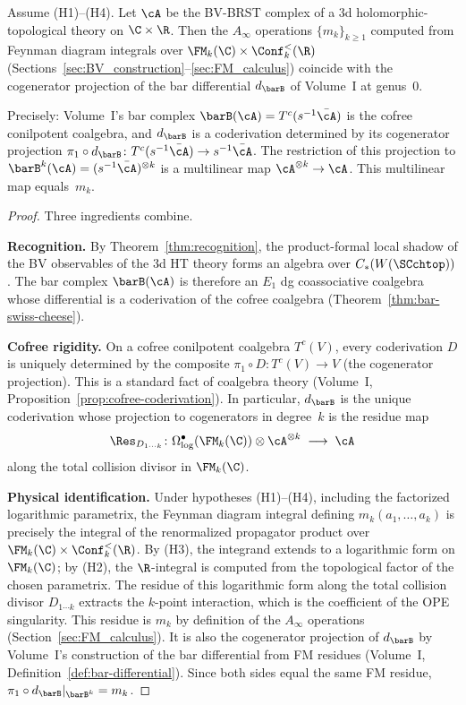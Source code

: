 \begin{theorem}[Feynman $m_k$ = bar differential at genus~$0$;
\ClaimStatusProvedHere]
Assume \textrm{(H1)--(H4)}. Let $\cA$ be the BV-BRST complex of
a 3d holomorphic-topological theory on $\C \times \R$. Then the
$A_\infty$ operations $\{m_k\}_{k \geq 1}$ computed from Feynman
diagram integrals over $\FM_k(\C) \times \Conf_k^{<}(\R)$
(Sections~\ref{sec:BV_construction}--\ref{sec:FM_calculus})
coincide with the cogenerator projection of the bar differential
$d_{\barB}$ of Volume~I at genus~$0$.

Precisely: Volume~I's bar complex
$\barB(\cA) = T^c(s^{-1}\bar{\cA})$ is the cofree conilpotent
coalgebra, and $d_{\barB}$ is a coderivation determined by its
cogenerator projection
$\pi_1 \circ d_{\barB} \colon T^c(s^{-1}\bar{\cA}) \to
s^{-1}\bar{\cA}$. The restriction of this projection to
$\barB^k(\cA) = (s^{-1}\bar{\cA})^{\otimes k}$ is a multilinear
map $\cA^{\otimes k} \to \cA$. This multilinear map
equals~$m_k$.
\end{theorem}

\begin{proof}
Three ingredients combine.

\textbf{Recognition.}
By Theorem~\ref{thm:recognition}, the product-formal local shadow of
the BV observables of the 3d HT theory forms an algebra over
$C_\ast(W(\SCchtop))$. The bar complex
$\barB(\cA)$ is therefore an $E_1$ dg coassociative coalgebra
whose differential is a coderivation
of the cofree coalgebra
(Theorem~\ref{thm:bar-swiss-cheese}).

\textbf{Cofree rigidity.}
On a cofree conilpotent coalgebra $T^c(V)$, every coderivation
$D$ is uniquely determined by the composite
$\pi_1 \circ D \colon T^c(V) \to V$ (the cogenerator projection).
This is a standard fact of coalgebra theory
\textup{(}Volume~I, Proposition~\ref*{prop:cofree-coderivation}\textup{)}.
In particular, $d_{\barB}$ is the unique coderivation whose
projection to cogenerators in degree~$k$ is the residue map
\[
\Res_{D_{1\cdots k}} \colon
\Omega^\bullet_{\log}(\FM_k(\C)) \otimes \cA^{\otimes k}
\;\longrightarrow\; \cA
\]
along the total collision divisor in $\FM_k(\C)$.

\textbf{Physical identification.}
Under hypotheses (H1)--(H4), including the factorized logarithmic
parametrix, the Feynman diagram integral defining
$m_k(a_1, \ldots, a_k)$ is precisely the integral of the
renormalized propagator product over $\FM_k(\C) \times
\Conf_k^{<}(\R)$. By (H3), the integrand extends to a
logarithmic form on $\FM_k(\C)$; by (H2), the $\R$-integral is
computed from the topological factor of the chosen parametrix. The
residue of this logarithmic form along the total collision
divisor $D_{1\cdots k}$ extracts the $k$-point interaction, which
is the coefficient of the OPE singularity. This residue is
$m_k$ by definition of the $A_\infty$ operations
(Section~\ref{sec:FM_calculus}). It is also the cogenerator
projection of $d_{\barB}$ by Volume~I's construction of the bar
differential from FM residues
(Volume~I, Definition~\ref*{def:bar-differential}).
Since both sides equal the same FM residue,
$\pi_1 \circ d_{\barB}|_{\barB^k} = m_k$.
\end{proof}

